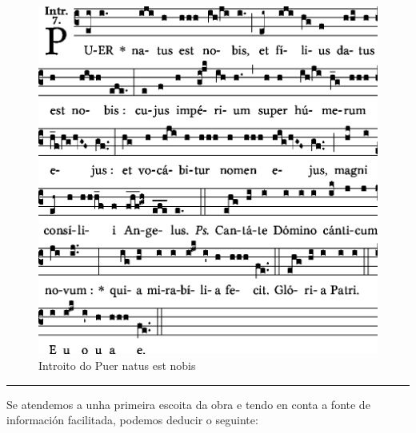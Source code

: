 \documentclass[spanish, a4paper,nobind]{templates/ociamthesis}
\begin{document}
\begin{figure}[ht]

{\centering \includegraphics[width=1\linewidth]{figures/audicions/Puer-natus} 

}

\caption[Puer natus est  nobis]{Introito do Puer natus est nobis}\label{fig:Puer-natus-est}
\end{figure}

\begin{center}\rule{0.5\linewidth}{0.5pt}\end{center}

Se atendemos a unha primeira escoita da obra e tendo en conta a fonte de información facilitada, podemos deducir o seguinte:
\end{document}
